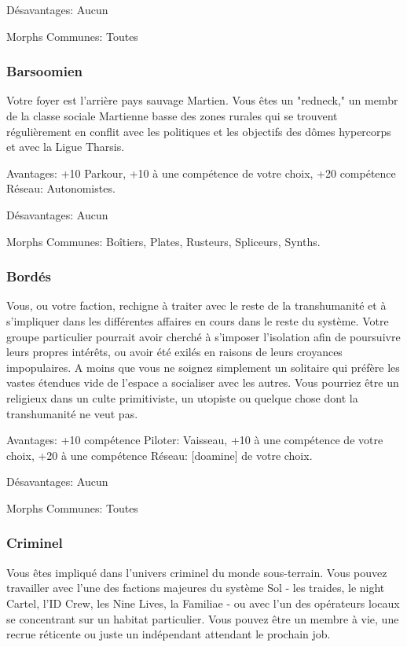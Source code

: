Désavantages: Aucun 

Morphs Communes: Toutes 

\subsubsection{Barsoomien} \label{sec:barsoomian} 

Votre foyer est l'arrière pays sauvage Martien. Vous êtes un "redneck," un membr de la classe sociale Martienne basse des zones rurales qui se trouvent régulièrement en conflit avec les politiques et les objectifs des dômes hypercorps et avec la Ligue Tharsis. 

Avantages: +10 Parkour, +10 à une compétence de votre choix, +20 compétence Réseau: Autonomistes. 

Désavantages: Aucun 

Morphs Communes: Boîtiers, Plates, Rusteurs, Spliceurs, Synths. 

\subsubsection{Bordés} \label{sec:brinker} 

Vous, ou votre faction, rechigne à traiter avec le reste de la transhumanité et à s'impliquer dans les différentes affaires en cours dans le reste du système. Votre groupe particulier pourrait avoir cherché à s'imposer l'isolation afin de poursuivre leurs propres intérêts, ou avoir été exilés en raisons de leurs croyances impopulaires. A moins que vous ne soignez simplement un solitaire qui préfère les vastes étendues vide de l'espace a socialiser avec les autres. Vous pourriez être un religieux dans un culte primitiviste, un utopiste ou quelque chose dont la transhumanité ne veut pas. 

Avantages: +10 compétence Piloter: Vaisseau, +10 à une compétence de votre choix, +20 à une compétence Réseau: [doamine] de votre choix. 

Désavantages: Aucun 

Morphs Communes: Toutes 

\subsubsection{Criminel} \label{sec:criminal} 

Vous êtes impliqué dans l'univers criminel du monde sous-terrain. Vous pouvez travailler avec l'une des factions majeures du système Sol - les traides, le night Cartel, l'ID Crew, les Nine Lives, la Familiae - ou avec l'un des opérateurs locaux se concentrant sur un habitat particulier. Vous pouvez être un membre à vie, une recrue réticente ou juste un indépendant attendant le prochain job. 

